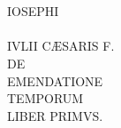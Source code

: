 

\chapter{}
\begin{center} \vspace{-18mm}
{\scshape
\LARGE IOSEPHI\\ \vspace{5mm}
\\ \vspace{3mm}
\LARGE IVLII CÆSARIS F.\\ \vspace{3mm}
\large DE\\
\Huge EMENDATIONE\\ \vspace{2mm}
\Large TEMPORUM\\ \vspace{2mm}
\normalsize LIBER PRIMVS.\\
}%
\end{center}
\normalsize

